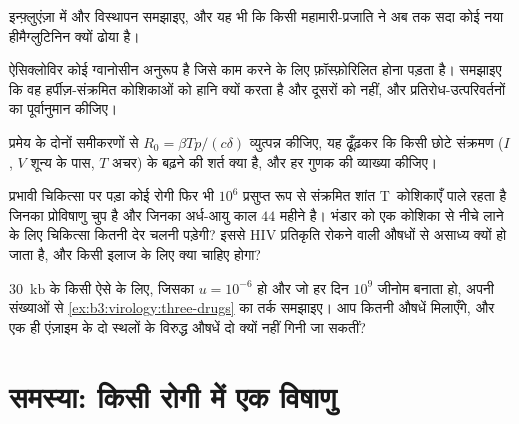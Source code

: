 \begin{exercise}[$\star\star$]\label{exo:b3:virology:8}
इन्फ़्लुएंज़ा में  और विस्थापन समझाइए, और यह भी कि किसी
महामारी-प्रजाति ने अब तक सदा कोई नया हीमैग्लुटिनिन क्यों ढोया है।
\end{exercise}

\begin{exercise}[$\star\star$]\label{exo:b3:virology:9}
ऐसिक्लोविर कोई ग्वानोसीन अनुरूप है जिसे काम करने के लिए फ़ॉस्फ़ोरिलित
होना पड़ता है। समझाइए कि वह हर्पीज़-संक्रमित कोशिकाओं को हानि क्यों करता
है और दूसरों को नहीं, और प्रतिरोध-उत्परिवर्तनों का पूर्वानुमान कीजिए।
\end{exercise}

\begin{exercise}[$\star\star\star$]\label{exo:b3:virology:10}
प्रमेय के दोनों समीकरणों से $R_{0} = \beta Tp/(c\delta)$ व्युत्पन्न
कीजिए, यह ढूँढ़कर कि किसी छोटे संक्रमण ($I$, $V$ शून्य के पास,
$T$ अचर) के बढ़ने की शर्त क्या है, और हर गुणक की व्याख्या कीजिए।
\end{exercise}

\begin{exercise}[$\star\star\star$]\label{exo:b3:virology:11}
प्रभावी चिकित्सा पर पड़ा कोई रोगी फिर भी $10^{6}$ प्रसुप्त रूप से
संक्रमित शांत T~कोशिकाएँ पाले रहता है जिनका प्रोविषाणु चुप है और जिनका
अर्ध-आयु काल $44$ महीने है। भंडार को एक कोशिका से नीचे लाने के लिए
चिकित्सा कितनी देर चलनी पड़ेगी? इससे HIV प्रतिकृति रोकने वाली औषधों से
असाध्य क्यों हो जाता है, और किसी इलाज के लिए क्या चाहिए होगा?
\end{exercise}

\begin{exercise}[$\star\star\star$]\label{exo:b3:virology:12}
\qty{30}{kb} के किसी ऐसे  के लिए, जिसका $u = 10^{-6}$ हो और जो
हर दिन $10^{9}$ जीनोम बनाता हो, अपनी संख्याओं से
\cref{ex:b3:virology:three-drugs} का तर्क समझाइए। आप कितनी औषधें
मिलाएँगे, और एक ही एंज़ाइम के दो स्थलों के विरुद्ध औषधें दो क्यों नहीं
गिनी जा सकतीं?
\end{exercise}

\section{समस्या: किसी रोगी में एक विषाणु}

